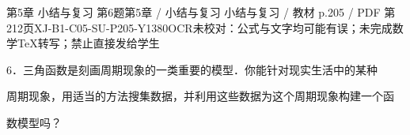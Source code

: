 \begin{bankitem}{第5章 小结与复习 第6题}{第5章 / 小结与复习 小结与复习 / 教材 p.205 / PDF 第212页}{XJ-B1-C05-SU-P205-Y1380}{OCR未校对：公式与文字均可能有误；未完成数学TeX转写；禁止直接发给学生}
\begin{ocrdraft}
\par
6．三角函数是刻画周期现象的一类重要的模型．你能针对现实生活中的某种
\par
周期现象，用适当的方法搜集数据，并利用这些数据为这个周期现象构建一个函
\par
数模型吗？
\end{ocrdraft}
\end{bankitem}
